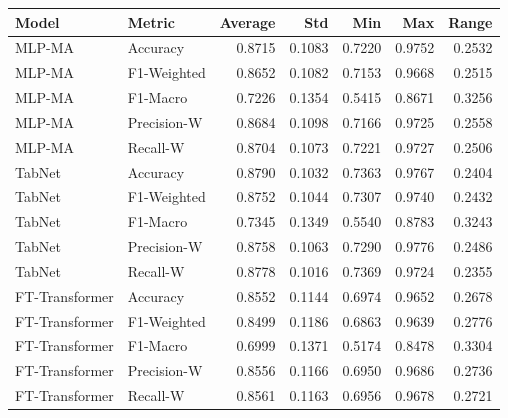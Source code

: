 \begin{tabular}{llrrrrr}
\toprule
Model & Metric & Average & Std & Min & Max & Range \\
\midrule
MLP-MA & Accuracy & 0.8715 & 0.1083 & 0.7220 & 0.9752 & 0.2532 \\
MLP-MA & F1-Weighted & 0.8652 & 0.1082 & 0.7153 & 0.9668 & 0.2515 \\
MLP-MA & F1-Macro & 0.7226 & 0.1354 & 0.5415 & 0.8671 & 0.3256 \\
MLP-MA & Precision-W & 0.8684 & 0.1098 & 0.7166 & 0.9725 & 0.2558 \\
MLP-MA & Recall-W & 0.8704 & 0.1073 & 0.7221 & 0.9727 & 0.2506 \\
TabNet & Accuracy & 0.8790 & 0.1032 & 0.7363 & 0.9767 & 0.2404 \\
TabNet & F1-Weighted & 0.8752 & 0.1044 & 0.7307 & 0.9740 & 0.2432 \\
TabNet & F1-Macro & 0.7345 & 0.1349 & 0.5540 & 0.8783 & 0.3243 \\
TabNet & Precision-W & 0.8758 & 0.1063 & 0.7290 & 0.9776 & 0.2486 \\
TabNet & Recall-W & 0.8778 & 0.1016 & 0.7369 & 0.9724 & 0.2355 \\
FT-Transformer & Accuracy & 0.8552 & 0.1144 & 0.6974 & 0.9652 & 0.2678 \\
FT-Transformer & F1-Weighted & 0.8499 & 0.1186 & 0.6863 & 0.9639 & 0.2776 \\
FT-Transformer & F1-Macro & 0.6999 & 0.1371 & 0.5174 & 0.8478 & 0.3304 \\
FT-Transformer & Precision-W & 0.8556 & 0.1166 & 0.6950 & 0.9686 & 0.2736 \\
FT-Transformer & Recall-W & 0.8561 & 0.1163 & 0.6956 & 0.9678 & 0.2721 \\
\bottomrule
\end{tabular}
